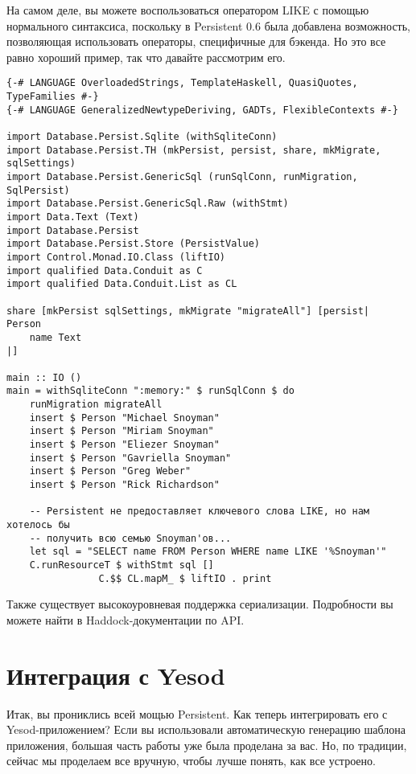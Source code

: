 \begin{remark}
На самом деле, вы можете воспользоваться оператором LIKE с помощью нормального синтаксиса, поскольку в Persistent 0.6 была добавлена возможность, позволяющая использовать операторы, специфичные для бэкенда. Но это все равно хороший пример, так что давайте рассмотрим его.
\end{remark}

\begin{lstlisting}
{-# LANGUAGE OverloadedStrings, TemplateHaskell, QuasiQuotes, TypeFamilies #-}
{-# LANGUAGE GeneralizedNewtypeDeriving, GADTs, FlexibleContexts #-}

import Database.Persist.Sqlite (withSqliteConn)
import Database.Persist.TH (mkPersist, persist, share, mkMigrate, sqlSettings)
import Database.Persist.GenericSql (runSqlConn, runMigration, SqlPersist)
import Database.Persist.GenericSql.Raw (withStmt)
import Data.Text (Text)
import Database.Persist
import Database.Persist.Store (PersistValue)
import Control.Monad.IO.Class (liftIO)
import qualified Data.Conduit as C
import qualified Data.Conduit.List as CL

share [mkPersist sqlSettings, mkMigrate "migrateAll"] [persist|
Person
    name Text
|]

main :: IO ()
main = withSqliteConn ":memory:" $ runSqlConn $ do
    runMigration migrateAll
    insert $ Person "Michael Snoyman"
    insert $ Person "Miriam Snoyman"
    insert $ Person "Eliezer Snoyman"
    insert $ Person "Gavriella Snoyman"
    insert $ Person "Greg Weber"
    insert $ Person "Rick Richardson"

    -- Persistent не предоставляет ключевого слова LIKE, но нам хотелось бы
    -- получить всю семью Snoyman'ов...
    let sql = "SELECT name FROM Person WHERE name LIKE '%Snoyman'"
    C.runResourceT $ withStmt sql []
                C.$$ CL.mapM_ $ liftIO . print
\end{lstlisting}%

Также существует высокоуровневая поддержка сериализации. Подробности вы можете найти в Haddock-документации по API.

\section{Интеграция с Yesod} %

Итак, вы прониклись всей мощью Persistent. Как теперь интегрировать его с Yesod-приложением? Если вы использовали автоматическую генерацию шаблона приложения, большая часть работы уже была проделана за вас. Но, по традиции, сейчас мы проделаем все вручную, чтобы лучше понять, как все устроено.

